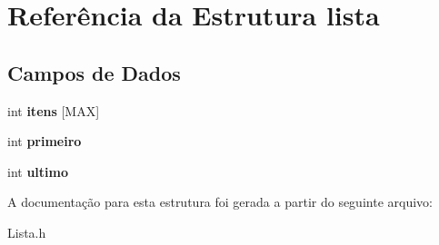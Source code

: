 \hypertarget{structlista}{\section{Referência da Estrutura lista}
\label{structlista}
}
\subsection*{Campos de Dados}
\begin{DoxyCompactItemize}
\item 
\hypertarget{structlista_a161ad42dc1b4aa93d5a19fdf8f5216d3}{int {\bfseries itens} \mbox{[}M\+A\+X\mbox{]}}\label{structlista_a161ad42dc1b4aa93d5a19fdf8f5216d3}

\item 
\hypertarget{structlista_ae90a72db60ea67bea0f0342355a95a7f}{int {\bfseries primeiro}}\label{structlista_ae90a72db60ea67bea0f0342355a95a7f}

\item 
\hypertarget{structlista_a79ee4fd889858454a41d6da80a4f5c10}{int {\bfseries ultimo}}\label{structlista_a79ee4fd889858454a41d6da80a4f5c10}

\end{DoxyCompactItemize}


A documentação para esta estrutura foi gerada a partir do seguinte arquivo\+:\begin{DoxyCompactItemize}
\item 
Lista.\+h\end{DoxyCompactItemize}
